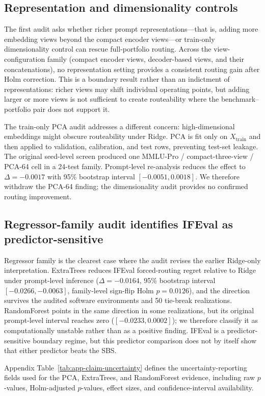 \documentclass{article}
\begin{document}
\subsection{Representation and dimensionality controls}
The first audit asks whether richer prompt representations---that is, adding more embedding views beyond the compact encoder views---or train-only dimensionality control can rescue full-portfolio routing. Across the view-configuration family (compact encoder views, decoder-based views, and their concatenations), no representation setting provides a consistent routing gain after Holm correction. This is a boundary result rather than an indictment of representations: richer views may shift individual operating points, but adding larger or more views is not sufficient to create routeability where the benchmark--portfolio pair does not support it.

The train-only PCA audit addresses a different concern: high-dimensional embeddings might obscure routeability under Ridge. PCA is fit only on $X_{\text{train}}$ and then applied to validation, calibration, and test rows, preventing test-set leakage. The original seed-level screen produced one MMLU-Pro / compact-three-view / PCA-64 cell in a 24-test family. Prompt-level re-analysis reduces the effect to $\Delta=-0.0017$ with 95\% bootstrap interval $[-0.0051,0.0018]$. We therefore withdraw the PCA-64 finding; the dimensionality audit provides no confirmed routing improvement.

\subsection{Regressor-family audit identifies IFEval as predictor-sensitive}
Regressor family is the clearest case where the audit revises the earlier Ridge-only interpretation. ExtraTrees reduces IFEval forced-routing regret relative to Ridge under prompt-level inference ($\Delta=-0.0164$, 95\% bootstrap interval $[-0.0266,-0.0063]$, family-level sign-flip Holm $p=0.0126$), and the direction survives the audited software environments and 50 tie-break realizations. RandomForest points in the same direction in some realizations, but its original prompt-level interval reaches zero ($[-0.0233,0.0002]$); we therefore classify it as computationally unstable rather than as a positive finding. IFEval is a predictor-sensitive boundary regime, but this predictor comparison does not by itself show that either predictor beats the SBS.

Appendix Table~\ref{tab:app-claim-uncertainty} defines the uncertainty-reporting fields used for the PCA, ExtraTrees, and RandomForest evidence, including raw $p$-values, Holm-adjusted $p$-values, effect sizes, and confidence-interval availability.
\end{document}
